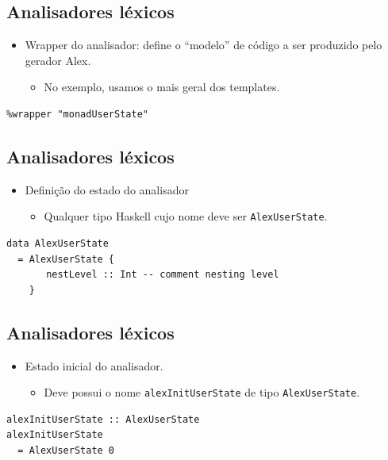 \documentclass[11pt]{article}
\begin{document}
\subsection*{Analisadores léxicos}
\label{sec:orgc1bcafe}

\begin{itemize}
\item Wrapper do analisador: define o ``modelo'' de código a ser produzido pelo gerador Alex.
\begin{itemize}
\item No exemplo, usamos o mais geral dos templates.
\end{itemize}
\end{itemize}

\begin{verbatim}
%wrapper "monadUserState"
\end{verbatim}
\subsection*{Analisadores léxicos}
\label{sec:orge9e93b4}

\begin{itemize}
\item Definição do estado do analisador
\begin{itemize}
\item Qualquer tipo Haskell cujo nome deve ser \texttt{AlexUserState}.
\end{itemize}
\end{itemize}

\begin{verbatim}
data AlexUserState
  = AlexUserState {
       nestLevel :: Int -- comment nesting level
    }
\end{verbatim}
\subsection*{Analisadores léxicos}
\label{sec:org7b4400a}

\begin{itemize}
\item Estado inicial do analisador.
\begin{itemize}
\item Deve possui o nome \texttt{alexInitUserState} de tipo \texttt{AlexUserState}.
\end{itemize}
\end{itemize}

\begin{verbatim}
alexInitUserState :: AlexUserState
alexInitUserState
  = AlexUserState 0
\end{verbatim}
\end{document}
